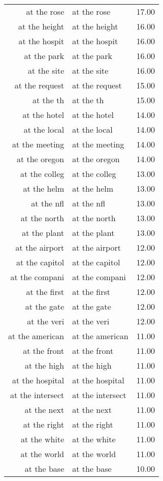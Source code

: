 \begin{table}[ht]
\begin{tabular}{rlr}
  at the rose & at the rose & 17.00 \\ 
  at the height & at the height & 16.00 \\ 
  at the hospit & at the hospit & 16.00 \\ 
  at the park & at the park & 16.00 \\ 
  at the site & at the site & 16.00 \\ 
  at the request & at the request & 15.00 \\ 
  at the th & at the th & 15.00 \\ 
  at the hotel & at the hotel & 14.00 \\ 
  at the local & at the local & 14.00 \\ 
  at the meeting & at the meeting & 14.00 \\ 
  at the oregon & at the oregon & 14.00 \\ 
  at the colleg & at the colleg & 13.00 \\ 
  at the helm & at the helm & 13.00 \\ 
  at the nfl & at the nfl & 13.00 \\ 
  at the north & at the north & 13.00 \\ 
  at the plant & at the plant & 13.00 \\ 
  at the airport & at the airport & 12.00 \\ 
  at the capitol & at the capitol & 12.00 \\ 
  at the compani & at the compani & 12.00 \\ 
  at the first & at the first & 12.00 \\ 
  at the gate & at the gate & 12.00 \\ 
  at the veri & at the veri & 12.00 \\ 
  at the american & at the american & 11.00 \\ 
  at the front & at the front & 11.00 \\ 
  at the high & at the high & 11.00 \\ 
  at the hospital & at the hospital & 11.00 \\ 
  at the intersect & at the intersect & 11.00 \\ 
  at the next & at the next & 11.00 \\ 
  at the right & at the right & 11.00 \\ 
  at the white & at the white & 11.00 \\ 
  at the world & at the world & 11.00 \\ 
  at the base & at the base & 10.00 \\ 

\end{tabular}
\end{table}
